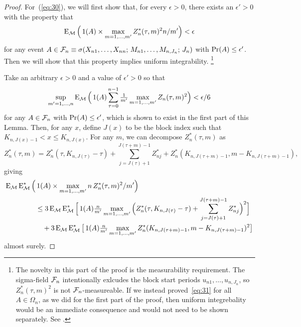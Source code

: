 \documentclass[11pt]{article}
\begin{document}
\begin{proof}
  For~(\ref{eq:30}), we will first show that, for every $\epsilon > 0$,
  there exists an $\epsilon' > 0$ with the property that
  \begin{equation}\label{eq:31}
    \operatorname{E}_{\mathcal{M}} \Big(\operatorname{1}(A) \times \max_{m = 1,\dots,m'} Z^*_n(\tau, m)^2 n / m'\Big) < \epsilon
  \end{equation}
  for any event $A \in \mathcal{F}_n \equiv \sigma(X_{n1},\dots,X_{nn};\,
  M_{n1},\dots,M_{n,J_n};\, J_n)$ with $\operatorname{Pr}(A) \leq
  \epsilon'$. Then we will show that this property implies uniform
  integrability.%
\footnote{The novelty in this part of the proof is the measurability
  requirement. The sigma-field $\mathcal{F}_n$ intentionally exlcudes the
  block start periods $u_{n1},\dots,u_{n,J_n}$, so
  $Z_n^{*}(\tau, m)^2$ is not $\mathcal{F}_n$-measureable. If we instead
  proved~\eqref{eq:31} for all $A \in \Omega_n$, as we did for the
  first part of the proof, then uniform integrebality would be an
  immediate consequence and would not need to be shown separately. See
  \citet[Theorem 12.9]{Dav:94}.} %

  Take an arbitrary $\epsilon > 0$ and a value of $\epsilon' > 0$
  so that
  \begin{equation*}
    \sup_{m'=1,\dots,n} \operatorname{E}_{\mathcal{M}} \Big(\operatorname{1}(A) \sum_{\tau = 0}^{n-1} \tfrac{1}{m'} \max_{m = 1,\dots,m'}
    Z_n(\tau, m)^2\Big) < \epsilon / 6
  \end{equation*}
  for any $A \in \mathcal{F}_n$ with $\operatorname{Pr}(A) \leq \epsilon'$, which is
  shown to exist in the first part of this Lemma. Then, for any $x$,
  define $J(x)$ to be the block index such that $K_{n,J(x) - 1} < x
  \leq K_{n,J(x)}$. For any $m$, we can decompose $Z_n^{*}(\tau, m)$ as
  \begin{equation*}
  Z^{*}_n(\tau, m) = Z_n^*(\tau, K_{n,J(\tau)} - \tau) +
  \sum_{j=J(\tau)+1}^{J(\tau + m)-1} Z_{nj}^* + Z_n^*(K_{n,J(\tau+m)-1}, m - K_{n,J(\tau + m)-1}),
  \end{equation*}
  giving
  \begin{align}
  \operatorname{E}_{\mathcal{M}} \operatorname{E}_{\mathcal{M}}^* \Big(&\operatorname{1}(A) \times \max_{m = 1,\dots,m'} n \, Z^*_n(\tau, m)^2 / m'\Big)
  \notag \\
  &\leq 3 \operatorname{E}_{\mathcal{M}} \operatorname{E}_{\mathcal{M}}^* \Big[\operatorname{1}(A) \tfrac{n}{m'}\max_{m = 1,\dots, m'}
  \Big(Z_n^*(\tau, K_{n,J(\tau)} - \tau) + \sum_{j=J(\tau)+1}^{J(\tau + m)-1} Z_{nj}^*\Big)^2\Big]
  \notag \\
  &\quad + 3 \operatorname{E}_{\mathcal{M}} \operatorname{E}_{\mathcal{M}}^* \big[\operatorname{1}(A) \tfrac{n}{m'}
  \max_{m=1,\dots,m'} Z_n^*(K_{n,J(\tau+m)-1}, m - K_{n,J(\tau + m)-1})^2 \big]\label{eq:6}
  \end{align}
  almost surely.


\end{proof}
\end{document}
